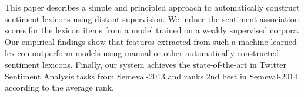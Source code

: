 This paper describes a simple and principled approach to automatically construct sentiment lexicons using distant supervision. We induce the sentiment association scores for the lexicon items from a model trained on a weakly supervised corpora. Our empirical findings show that features extracted from such a machine-learned lexicon outperform models using manual or other automatically constructed sentiment lexicons. Finally, our system achieves the state-of-the-art in Twitter Sentiment Analysis tasks from Semeval-2013 and ranks 2nd best in Semeval-2014 according to the average rank.
